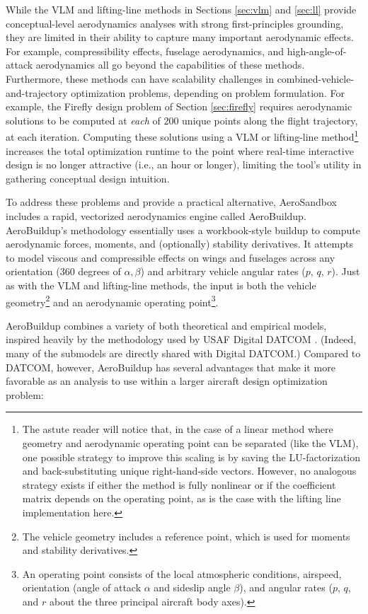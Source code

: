 While the VLM and lifting-line methods in Sections \ref{sec:vlm} and \ref{sec:ll} provide conceptual-level aerodynamics analyses with strong first-principles grounding, they are limited in their ability to capture many important aerodynamic effects. For example, compressibility effects, fuselage aerodynamics, and high-angle-of-attack aerodynamics all go beyond the capabilities of these methods. Furthermore, these methods can have scalability challenges in combined-vehicle-and-trajectory optimization problems, depending on problem formulation. For example, the Firefly design problem of Section \ref{sec:firefly} requires aerodynamic solutions to be computed at \emph{each} of 200 unique points along the flight trajectory, at each iteration. Computing these solutions using a VLM or lifting-line method\footnote{The astute reader will notice that, in the case of a linear method where geometry and aerodynamic operating point can be separated (like the VLM), one possible strategy to improve this scaling is by saving the LU-factorization and back-substituting unique right-hand-side vectors. However, no analogous strategy exists if either the method is fully nonlinear or if the coefficient matrix depends on the operating point, as is the case with the lifting line implementation here.} increases the total optimization runtime to the point where real-time interactive design is no longer attractive (i.e., an hour or longer), limiting the tool's utility in gathering conceptual design intuition.

To address these problems and provide a practical alternative, AeroSandbox includes a rapid, vectorized aerodynamics engine called AeroBuildup. AeroBuildup's methodology essentially uses a workbook-style buildup to compute aerodynamic forces, moments, and (optionally) stability derivatives. It attempts to model viscous and compressible effects on wings and fuselages across any orientation (360 degrees of $\alpha, \beta$) and arbitrary vehicle angular rates ($p$, $q$, $r$). Just as with the VLM and lifting-line methods, the input is both the vehicle geometry\footnote{The vehicle geometry includes a reference point, which is used for moments and stability derivatives.} and an aerodynamic operating point\footnote{An operating point consists of the local atmospheric conditions, airspeed, orientation (angle of attack $\alpha$ and sideslip angle $\beta$), and angular rates ($p$, $q$, and $r$ about the three principal aircraft body axes).}.

AeroBuildup combines a variety of both theoretical and empirical models, inspired heavily by the methodology used by USAF Digital DATCOM \cite{datcom}. (Indeed, many of the submodels are directly shared with Digital DATCOM.) Compared to DATCOM, however, AeroBuildup has several advantages that make it more favorable as an analysis to use within a larger aircraft design optimization problem:

